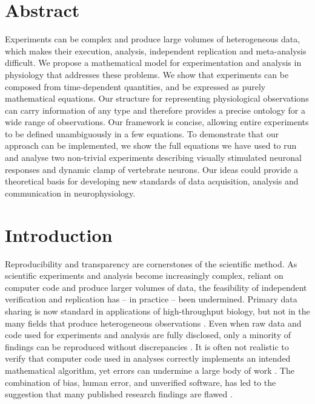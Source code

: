 \section*{Abstract}
 
Experiments can be complex and produce large volumes of heterogeneous
data, which makes their execution, analysis, independent replication
and meta-analysis difficult. We propose a mathematical model for
experimentation and analysis in physiology that addresses these
problems. We show that experiments can be composed from time-dependent
quantities, and be expressed as purely mathematical equations. Our
structure for representing physiological observations can carry
information of any type and therefore provides a precise ontology for
a wide range of observations. Our framework is concise, allowing
entire experiments to be defined unambiguously in a few equations. To
demonstrate that our approach can be implemented, we show the full
equations we have used to run and analyse two non-trivial experiments
describing visually stimulated neuronal responses and dynamic clamp of
vertebrate neurons. Our ideas could provide a theoretical basis for
developing new standards of data acquisition, analysis and
communication in neurophysiology.

\pagebreak

\section*{Introduction}

Reproducibility and transparency are cornerstones of the scientific
method. As scientific experiments and analysis become increasingly
complex, reliant on computer code and produce larger volumes of data,
the feasibility of independent verification and replication has -- in
practice -- been undermined. Primary data sharing is now standard in
applications of high-throughput biology, but not in the many fields
that produce heterogeneous observations \citep{Gardner2005,
  Tukey1962}. Even when raw data and code used for experiments and
analysis are fully disclosed, only a minority of findings can be
reproduced without discrepancies \citep{Ioannidis2008,Baggerly2009,
  McCullough2007}. It is often not realistic to verify that computer
code used in analyses correctly implements an intended mathematical
algorithm, yet errors can undermine a large body of work
\citep{Chang2006}. The combination of bias, human error, and unverified
software, has led to the suggestion that many published research
findings are flawed \citep{Ioannidis2005, Merali2010}.

